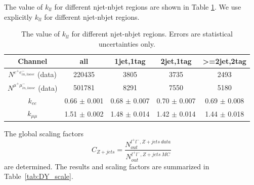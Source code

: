 The value of $k_{ll}$ for different njet-nbjet regions are shown in Table \ref{tab:kll}. We use explicitly $k_{ll}$ for different njet-nbjet regions.
\begin{table}[ht]
\centering
\caption{The value of $k_{ll}$ for different njet-nbjet regions. Errors are statistical uncertainties only.}
\label{tab:kll}
\begin{tabular}{|c|c|c|c|c|}
\hline
Channel                                 & all                                       & 1jet,1tag                 & 2jet,1tag             & \textgreater=2jet,2tag \\ \hline
$N^{e^{+}e^{-}_{in, loose}}$ (data)     & 220435                                    & 3805                      & 3735                  & 2493                   \\ \hline
$N^{\mu^{+}\mu^{-}_{in, loose}}$ (data) & 501781                                    & 8291                      & 7550                  & 5180                  \\ \hline
$k_{ee}$                                & 0.66 $\pm$ 0.001                          & 0.68 $\pm$ 0.007          & 0.70 $\pm$ 0.007      & 0.69 $\pm$ 0.008         \\ \hline
$k_{\mu\mu}$                            & 1.51 $\pm$ 0.002                          & 1.48 $\pm$ 0.014          & 1.42 $\pm$ 0.014      & 1.44 $\pm$ 0.018         \\ \hline
\end{tabular}
\end{table}




The global scaling factors $${C}_{Z+jets}=\frac{N^{l^{+}l^{-}, Z+jets~data}_{out}}{N^{l^{+}l^{-},Z+jets~MC}_{out}}$$ are determined.
The results and scaling factors are summarized in Table~\ref{tab:DY_scale}.


